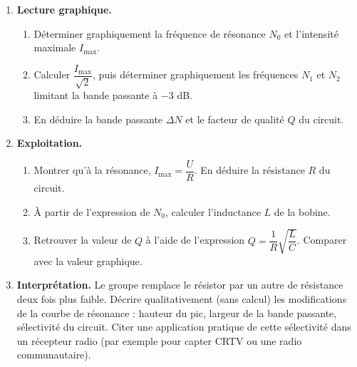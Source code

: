 \documentclass[11pt]{article}
\begin{document}
\begin{exercice}
\begin{enumerate}
\item \textbf{Lecture graphique.}
\begin{enumerate}
\item Déterminer graphiquement la fréquence de résonance $N_0$ et l'intensité maximale $I_{\max}$.
\item Calculer $\dfrac{I_{\max}}{\sqrt{2}}$, puis déterminer graphiquement les fréquences $N_1$ et $N_2$ limitant la bande passante à $-3$ dB.
\item En déduire la bande passante $\Delta N$ et le facteur de qualité $Q$ du circuit.
\end{enumerate}
\item \textbf{Exploitation.}
\begin{enumerate}
\item Montrer qu'à la résonance, $I_{\max} = \dfrac{U}{R}$. En déduire la résistance $R$ du circuit.
\item À partir de l'expression de $N_0$, calculer l'inductance $L$ de la bobine.
\item Retrouver la valeur de $Q$ à l'aide de l'expression $Q = \dfrac{1}{R}\sqrt{\dfrac{L}{C}}$. Comparer avec la valeur graphique.
\end{enumerate}
\item \textbf{Interprétation.} Le groupe remplace le résistor par un autre de résistance deux fois plus faible. Décrire qualitativement (sans calcul) les modifications de la courbe de résonance : hauteur du pic, largeur de la bande passante, sélectivité du circuit. Citer une application pratique de cette sélectivité dans un récepteur radio (par exemple pour capter CRTV ou une radio communautaire).
\end{enumerate}
\end{exercice}
\end{document}
